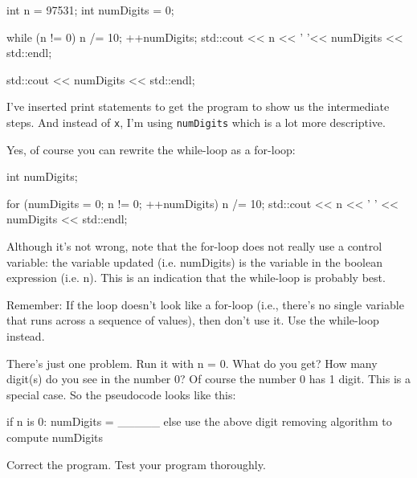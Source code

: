 \begin{console}
int n = 97531;
int numDigits = 0;

while (n != 0)
{     
      n /= 10;
      ++numDigits;
      std::cout << n << ' '<< numDigits << std::endl;
}

std::cout << numDigits << std::endl; 
\end{console}

I've inserted print statements to get the program to show us the intermediate steps. And instead of \texttt{x}, I'm using \texttt{numDigits} which is a lot more descriptive.

Yes, of course you can rewrite the while-loop as a for-loop:

\begin{console}
int numDigits;

for (numDigits = 0; n != 0; ++numDigits)
{   
    n /= 10;
    std::cout << n << ' ' << numDigits << std::endl;
} 
\end{console}

Although it's not wrong, note that the for-loop does not really use a control variable: the variable updated (i.e. numDigits) is the variable in the boolean expression (i.e. n). This is an indication that the while-loop is probably best.

Remember: If the loop doesn't look like a for-loop
(i.e., there's no single variable that runs across a
sequence of values), then don't use it. Use the
while-loop instead.

\begin{ex} There's just one problem. Run it with
n = 0. What do you get? How many digit(s) do you see in the number 0? Of
course the number 0 has 1 digit. This is a special case. So the
pseudocode looks like this:

\begin{console}
if n is 0:
   numDigits = _____             
else
   use the above digit removing algorithm to compute numDigits 
\end{console}
Correct the program. Test your program thoroughly.
\end{ex}
\newpage{}

